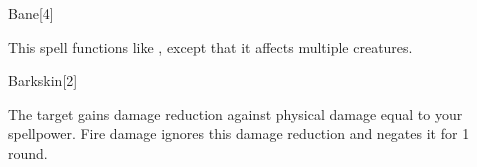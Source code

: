 \begin{spellsection}[Mass]{Bane}[4]
    \begin{spellheader}
    \end{spellheader}
    \begin{spellcontent}
        \begin{spelltargetinginfo}
        \end{spelltargetinginfo}
        \begin{spelleffects}
            \spellspecial This spell functions like , except that it affects multiple creatures.
        \end{spelleffects}
    \end{spellcontent}
    \begin{spellfooter}
        \miscastexplode
    \end{spellfooter}
\end{spellsection}

\begin{spellsection}{Barkskin}[2]
    \begin{spellheader}
    \end{spellheader}
    \begin{spellcontent}
        \begin{spelltargetinginfo}
        \end{spelltargetinginfo}
        \begin{spelleffects}
            \spelleffect The target gains damage reduction against physical damage equal to your spellpower. Fire damage ignores this damage reduction and negates it for 1 round.
            \spelldur \durpersonallong
        \end{spelleffects}
    \end{spellcontent}
    \begin{spellfooter}
        \miscastexplode
    \end{spellfooter}
\end{spellsection}

